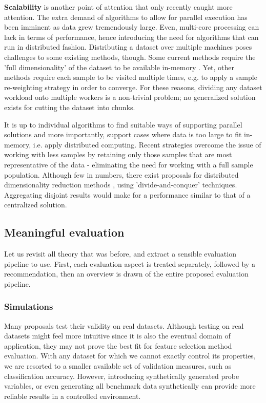 \documentclass{article}
\begin{document}
\textbf{Scalability} is another point of attention that only recently caught more attention. The extra demand of algorithms to allow for parallel execution has been imminent as data grew tremendously large. Even, multi-core processing can lack in terms of performance, hence introducing the need for algorithms that can run in distributed fashion. Distributing a dataset over multiple machines poses challenges to some existing methods, though. Some current methods require the 'full dimensionality' of the dataset to be available in-memory \citep{tang2014feature}. Yet, other methods require each sample to be visited multiple times, e.g. to apply a sample re-weighting strategy in order to converge. For these reasons, dividing any dataset workload onto multiple workers is a non-trivial problem; no generalized solution exists for cutting the dataset into chunks.

It is up to individual algorithms to find suitable ways of supporting parallel solutions and more importantly, support cases where data is too large to fit in-memory, i.e. apply distributed computing. Recent strategies overcome the issue of working with less samples by retaining only those samples that are most representative of the data - eliminating the need for working with a full sample population. Although few in numbers, there exist proposals for distributed dimensionality reduction methods \citep{JMLR:v21:19-537}, using 'divide-and-conquer' techniques. Aggregating disjoint results would make for a performance similar to that of a centralized solution.

\subsection{Meaningful evaluation}\label{sec:evaluation}
Let us revisit all theory that was before, and extract a sensible evaluation pipeline to use. First, each evaluation aspect is treated separately, followed by a recommendation, then an overview is drawn of the entire proposed evaluation pipeline.


\subsubsection{Simulations}\label{sec:evaluation-simulations}
Many proposals test their validity on real datasets. Although testing on real datasets might feel more intuitive since it is also the eventual domain of application, they may not prove the best fit for feature selection method evaluation. With any dataset for which we cannot exactly control its properties, we are resorted to a smaller available set of validation measures, such as classification accuracy. However, introducing synthetically generated probe variables, or even generating all benchmark data synthetically can provide more reliable results in a controlled environment.
\end{document}
